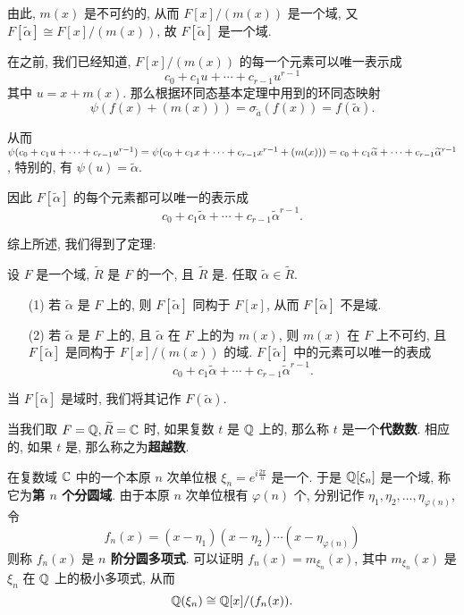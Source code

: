 由此, $m(x)$ 是不可约的, 从而 $F[x]/(m(x))$ 是一个域, 又 $F[\widetilde{\alpha}]\cong F[x]/(m(x))$, 故 $F[\widetilde{\alpha}]$ 是一个域.

在之前, 我们已经知道, $F[x]/(m(x))$ 的每一个元素可以唯一表示成 $$c_0+c_1u+\cdots+c_{r-1}u^{r-1}$$ 其中 $u=x+m(x)$. 那么根据环同态基本定理中用到的环同态映射 $$\psi(f(x)+(m(x)))=\sigma_{\widetilde{a}}(f(x))=f(\widetilde{\alpha}).$$

从而 $\psi(c_0+c_1u+\cdots+c_{r-1}u^{r-1})=\psi(c_0+c_1x+\cdots+c_{r-1}x^{r-1}+(m(x)))\\=c_0+c_1\widetilde{\alpha}+\cdots+c_{r-1}\widetilde{\alpha}^{r-1}$, 特别的, 有 $\psi(u)=\widetilde{\alpha}$.

因此 $F[\widetilde{\alpha}]$ 的每个元素都可以唯一的表示成 $$c_0+c_1\widetilde{\alpha}+\cdots+c_{r-1}\widetilde{\alpha}^{r-1}.$$

综上所述, 我们得到了定理:

\begin{theorem}
	设 $F$ 是一个域, $\widetilde{R}$ 是 $F$ 的一个, 且 $\widetilde{R}$ 是. 任取 $\widetilde{\alpha}\in \widetilde{R}$.

	\begin{itemize}[leftmargin=1.5cm]
		\item[(1)] 若 $\widetilde{\alpha}$ 是 $F$ 上的, 则 $F[\widetilde{\alpha}]$ 同构于 $F[x]$, 从而 $F[\widetilde{\alpha}]$ 不是域.
		\item[(2)] 若 $\widetilde{\alpha}$ 是 $F$ 上的, 且 $\widetilde{\alpha}$ 在 $F$ 上的为 $m(x)$, 则 $m(x)$ 在 $F$ 上不可约, 且 $F[\widetilde{\alpha}]$ 是同构于 $F[x]/(m(x))$ 的域. $F[\widetilde{\alpha}]$ 中的元素可以唯一的表成 $$c_0+c_1\widetilde{\alpha}+\cdots+c_{r-1}\widetilde{\alpha}^{r-1}.$$
	\end{itemize}
\end{theorem}

\begin{remark}
	当 $F[\widetilde{\alpha}]$ 是域时, 我们将其记作 $F(\widetilde{\alpha})$.
\end{remark}

\begin{definition}\label{代数数}\label{超越数}
	当我们取 $F=\mathbb Q,\widetilde{R}=\mathbb C$ 时, 如果复数 $t$ 是 $\mathbb Q$ 上的, 那么称 $t$ 是一个\textbf{代数数}. 相应的, 如果 $t$ 是, 那么称之为\textbf{超越数}.
\end{definition}

\begin{definition}\label{分圆域}\label{分圆多项式}
	在复数域 $\mathbb C$ 中的一个本原 $n$ 次单位根 $\xi_n=e^{i\frac{2\pi}{n}}$ 是一个. 于是 $\mathbb Q[\xi_n]$ 是一个域, 称它为\textbf{第 $n$ 个分圆域}. 由于本原 $n$ 次单位根有 $\varphi(n)$ 个, 分别记作 $\eta_1,\eta_2,\ldots,\eta_{\varphi(n)}$, 令 $$f_n(x)=(x-\eta_1)(x-\eta_2)\cdots(x-\eta_{\varphi(n)})$$ 则称 $f_n(x)$ 是 \textbf{$n$ 阶分圆多项式}. 可以证明 $f_n(x)=m_{\xi_n}(x)$, 其中 $m_{\xi_n}(x)$ 是 $\xi_n$ 在 $\mathbb Q$ 上的极小多项式, 从而 $$\mathbb Q(\xi_n)\cong \mathbb Q[x]/(f_n(x)).$$
\end{definition}

